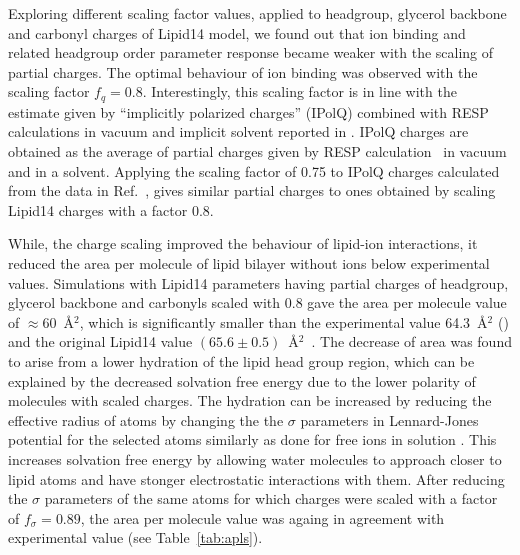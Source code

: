 \documentclass[aip,jcp,twocolumn]{revtex4}
\begin{document}
Exploring different scaling factor values, applied to headgroup, glycerol backbone
and carbonyl charges of Lipid14 model, we found out that ion binding and
related headgroup order parameter response became weaker with the scaling of partial
charges. The optimal behaviour of ion binding was observed with
the scaling factor $f_q = 0.8$. %
Interestingly, this scaling factor is in line with the estimate
given by ``implicitly polarized charges'' (IPolQ) \cite{ipolq2013}
combined with RESP calculations in vacuum and implicit solvent reported
in \cite{maciejewski14}. IPolQ charges are obtained as the average of
partial charges given by RESP calculation~\cite{RESP_paper}
in vacuum and in a solvent. Applying the scaling factor of 0.75 to
IPolQ charges calculated from the data in Ref.~\cite{maciejewski14},
gives similar partial charges to ones obtained by scaling Lipid14 charges
with a factor 0.8.


While, the charge scaling improved the behaviour of lipid-ion interactions,
it reduced the area per molecule of lipid bilayer without ions below experimental
values. Simulations with Lipid14 parameters having partial charges of headgroup, glycerol
backbone and carbonyls scaled with 0.8 gave the area per molecule value of $\approx$60~\AA$^2$,
which is significantly smaller than the experimental value 64.3~\AA$^2$ (\cite{})
and the original Lipid14 value $(65.6 \pm 0.5)$~\AA$^2$~\cite{dickson14}.
The decrease of area was found to arise from a lower hydration of the lipid head group region,
which can be explained by the decreased solvation free energy due to the lower polarity
of molecules with scaled charges. The hydration can be increased
by reducing the effective radius of atoms by changing the 
the $\sigma$ parameters in Lennard-Jones potential for the selected atoms
similarly as done for free ions in solution \cite{kohagen14,kohagen16,??}.
This increases solvation free energy by allowing water molecules to
approach closer to lipid atoms and have stonger electrostatic interactions with them.
After reducing the $\sigma$ parameters of the same atoms for which charges were scaled
with a factor of $f_\sigma = 0.89$, the area per molecule value was
againg in agreement with experimental value (see Table~\ref{tab:apls}). 
\end{document}

